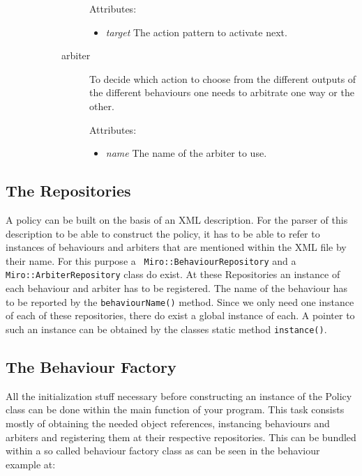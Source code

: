 \begin{description}
\begin{description}
\begin{description}
      Attributes: 
      \begin{itemize}
      \item \textit{target} The action pattern to activate next.
      \end{itemize}  

    \item[arbiter]
      To decide which action to choose from the different outputs of
      the different behaviours one needs to arbitrate one way or the other.

      Attributes: 
      \begin{itemize}
      \item \textit{name} The name of the arbiter to use.
      \end{itemize}
    \end{description}
  \end{description}
\end{description}

\subsection{The Repositories}

A policy can be built on the basis of an XML description. For the
parser of this description to be able to construct the policy, it has
to be able to refer to instances of behaviours and arbiters that are
mentioned within the XML file by their name.  For this purpose a {\tt
  Miro::BehaviourRepository} and a {\tt Miro::ArbiterRepository} class
do exist.  At these Repositories an instance of each behaviour and
arbiter has to be registered. The name of the behaviour has to be
reported by the {\tt behaviourName()} method.  Since we only need one
instance of each of these repositories, there do exist a global
instance of each. A pointer to such an instance can be obtained by
the classes static method {\tt instance()}.

\subsection{The Behaviour Factory}

All the initialization stuff necessary before constructing an instance
of the Policy class can be done within the main function of your
program. This task consists mostly of obtaining the needed object
references, instancing
behaviours and arbiters and registering them at their respective
repositories.  This can be bundled within a so called behaviour factory
class as can be seen in the behaviour example at:

